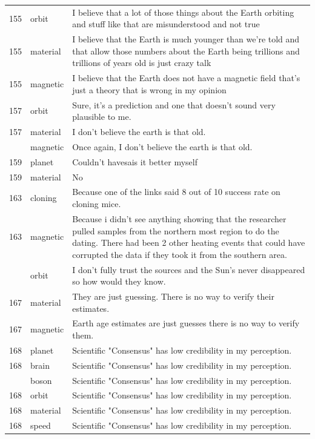 \documentclass[
  doc,floatsintext]{apa6}
\begin{document}
\begin{longtable}[t]{>{}r>{}l>{\raggedright\arraybackslash}p{30em}}
155 & orbit & I believe that a lot of those things about the Earth orbiting and stuff like that are misunderstood and not true\\
155 & material & I believe that the Earth is much younger than we're told and that allow those numbers about the Earth being trillions and trillions of years old is just crazy talk\\
155 & magnetic & I believe that the Earth does not have a magnetic field that's just a theory that is wrong in my opinion\\
157 & orbit & Sure, it's a prediction and one that doesn't sound very plausible to me.\\
157 & material & I don't believe the earth is that old.\\
\addlinespace
157 & magnetic & Once again, I don't believe the earth is that old.\\
159 & planet & Couldn't havesais it better myself\\
159 & material & No\\
163 & cloning & Because one of the links said 8 out of 10 success rate on cloning mice.\\
163 & magnetic & Because i didn't see anything showing that the researcher pulled samples from the northern most region to do the dating. There had been 2 other heating events that could have corrupted the data if they took it from the southern area.\\
\addlinespace
164 & orbit & I don't fully trust the sources and the Sun's never disappeared so how would they know.\\
167 & material & They are just guessing. There is no way to verify their estimates.\\
167 & magnetic & Earth age estimates are just guesses there is no way to verify them.\\
168 & planet & Scientific "Consensus" has low credibility in my perception.\\
168 & brain & Scientific "Consensus" has low credibility in my perception.\\
\addlinespace
168 & boson & Scientific "Consensus" has low credibility in my perception.\\
168 & orbit & Scientific "Consensus" has low credibility in my perception.\\
168 & material & Scientific "Consensus" has low credibility in my perception.\\
168 & speed & Scientific "Consensus" has low credibility in my perception.\\

\end{longtable}
\end{document}
